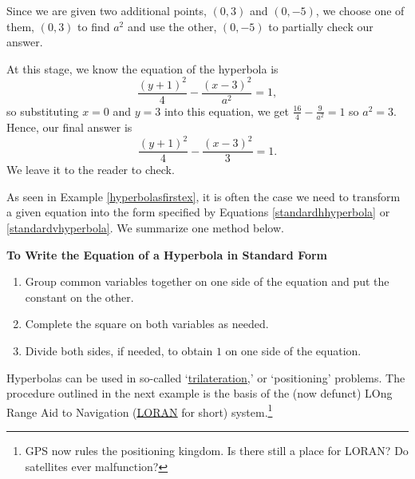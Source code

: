 \documentclass{ximera}
\begin{document}
\begin{example}
\begin{explanation}
\begin{enumerate}
\begin{enumerate}
Since we are given two additional points, $(0,3)$ and $(0,-5)$, we choose one of them, $(0,3)$ to find $a^2$ and use the other, $(0,-5)$ to partially check our answer. 




At this stage, we know the equation of the hyperbola is \[ \frac{(y+1)^2}{4} - \frac{(x-3)^2}{a^2} = 1,\] so substituting $x=0$ and $y=3$ into this equation, we get $\frac{16}{4} - \frac{9}{a^2} = 1$ so $a^2 = 3$.  Hence, our final answer is  \[ \frac{(y+1)^2}{4} - \frac{(x-3)^2}{3} = 1.\] We leave it to the reader to check. 

\end{enumerate}

\end{enumerate}
\end{explanation}
\end{example}

As seen in Example \ref{hyperbolasfirstex}, it is often the case we need to transform a given equation into the form specified by Equations \ref{standardhhyperbola} or  \ref{standardvhyperbola}.  We summarize one method below.




\centerline{\textbf{To Write the Equation of a Hyperbola in Standard Form}}

\begin{enumerate}


\item  Group common variables together on one side of the equation and put the constant on the other.

\item  Complete the square on both variables as needed.

\item  Divide both sides, if needed,  to obtain $1$ on one side of the equation.


\end{enumerate}




Hyperbolas can be used in so-called `\href{http://en.wikipedia.org/wiki/Trilateration}{\underline{trilateration}},' or `positioning' problems.  The procedure outlined in the next example is the basis of the (now defunct) LOng Range Aid to Navigation (\href{http://en.wikipedia.org/wiki/LORAN}{\underline{LORAN}} for short)  system.\footnote{GPS now rules the positioning kingdom.  Is there still a place for LORAN?  Do satellites ever malfunction?}
\end{document}
